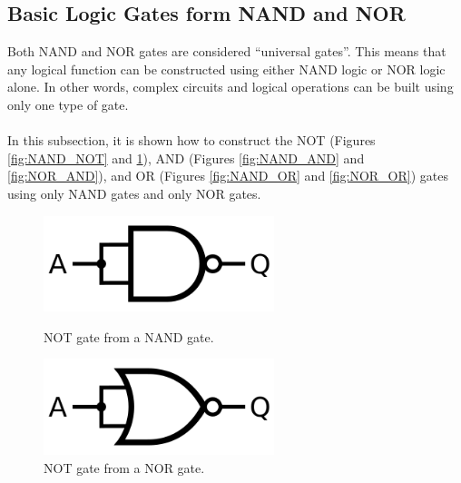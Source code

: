 
\subsection{Basic Logic Gates form NAND and NOR}
    Both NAND and NOR gates are considered \enquote{universal gates}. 
    This means that any logical function can be constructed using either NAND logic or NOR logic alone. 
    In other words, complex circuits and logical operations can be built using only one type of gate. \\\\
    In this subsection, it is shown how to construct the NOT (Figures \ref{fig:NAND_NOT} and \ref{fig:NOR_NOT}), AND (Figures \ref{fig:NAND_AND} and \ref{fig:NOR_AND}), and OR (Figures \ref{fig:NAND_OR} and \ref{fig:NOR_OR}) gates using only NAND gates and only NOR gates. \\

    \begin{figure}[H]   
        \begin{minipage}{0.5\textwidth}
            \centering
    	    \includegraphics[width=0.6\textwidth]{figures/circuits/NOT_from_NAND.png}
	        \caption{NOT gate from a NAND gate.}
	        \label{fig:NAND_NOT} 
	    \end{minipage}	
        \begin{minipage}{0.5\textwidth}
            \centering
    	    \includegraphics[width=0.6\textwidth]{figures/circuits/NOT_from_NOR.png}
            \caption{NOT gate from a NOR gate.}
            \label{fig:NOR_NOT}
        \end{minipage}
    \end{figure}

